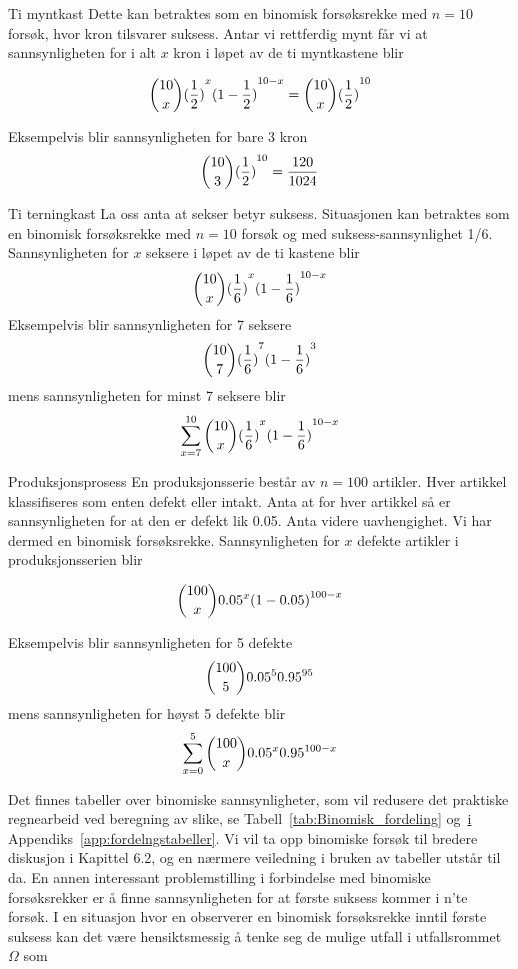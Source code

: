 \begin{eksempel}{Ti myntkast}
Dette kan betraktes som en binomisk forsøksrekke med $n=10$
forsøk, hvor kron tilsvarer suksess. Antar vi rettferdig mynt får
vi at sannsynligheten for i alt $x$ kron i løpet av de ti
myntkastene blir

\[ {{10}\choose{x}}{(\frac{1}{2})}^x{(1-\frac{1}{2})}^{10-x}=
          {{10}\choose{x}}{(\frac{1}{2})}^{10}  \]

\noindent Eksempelvis blir sannsynligheten for bare 3 kron
\[       {{10}\choose{3}}{(\frac{1}{2})}^{10}=\frac{120}{1024}  \]
\end{eksempel}
        
\begin{eksempel}{Ti terningkast}
La oss anta at sekser betyr suksess. Situasjonen kan betraktes
som en binomisk forsøksrekke med $n=10$ forsøk og med 
suksess-sannsynlighet 1/6. Sannsynligheten for $x$ seksere i løpet av de
ti kastene blir
\[ {{10}\choose{x}}{(\frac{1}{6})}^x{(1-\frac{1}{6})}^{10-x}  \]
\noindent Eksempelvis blir sannsynligheten for 7 seksere
\[ {{10}\choose{7}}{(\frac{1}{6})}^7{(1-\frac{1}{6})}^3  \]
\noindent mens sannsynligheten for minst 7 seksere blir
\[ \sum_{x=7}^{10}{{10}\choose{x}}{(\frac{1}{6})}^x{(1-\frac{1}{6})}^{10-x}  \]
\end{eksempel}

\begin{eksempel}{Produksjonsprosess}
En produksjonsserie består av $n=100$ artikler. Hver artikkel
klassifiseres som enten defekt eller intakt. Anta at for hver
artikkel så er sannsynligheten for at den er defekt lik 0.05.
Anta videre uavhengighet. Vi har dermed en binomisk
forsøksrekke. Sannsynligheten for $x$ defekte artikler i
produksjonsserien blir

\[ {{100}\choose{x}}{0.05}^x{(1-0.05)}^{100-x}  \]

\noindent Eksempelvis blir sannsynligheten for 5 defekte
\[ {{100}\choose{5}}{0.05}^5{0.95}^{95}  \]         
\noindent mens sannsynligheten for høyst 5 defekte blir
\[ \sum_{x=0}^{5} {{100}\choose{x}}{0.05}^x{0.95}^{100-x}  \]
\end{eksempel}

Det finnes tabeller over binomiske sannsynligheter, som vil
redusere det praktiske regnearbeid ved beregning av slike, se
Tabell~\ref{tab:Binomisk_fordeling} og~\href{tab:Binomisk_fordeling_p05} 
i Appendiks~\ref{app:fordelngstabeller}. Vi vil ta opp binomiske forsøk til
bredere diskusjon i Kapittel 6.2, og en nærmere veiledning i
bruken av tabeller utstår til da.
En annen interessant problemstilling i forbindelse med binomiske
forsøksrekker er å finne sannsynligheten for at første suksess
kommer i n'te forsøk. I en situasjon hvor en observerer en
binomisk forsøksrekke inntil første suksess kan det være
hensiktsmessig å tenke seg de mulige utfall i utfallsrommet
$\Omega$ som

